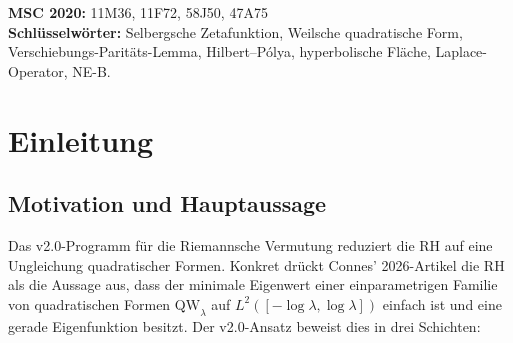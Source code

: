 \documentclass[12pt,a4paper]{article}
\theoremstyle{definition}
\theoremstyle{remark}
\newcommand{\QW}{\mathrm{QW}}
\begin{document}
\begin{abstract}
Die Abwesenheit des einschlägigen NE-B-Hindernisses im Selberg-Setting ist kein
Mangel; sie spiegelt die geometrische Koordination der Spurformel auf einem
gemeinsamen symmetrischen Raum wider, die bei den Primzahlen fehlt. Wir leiten
ein vorsichtiges Meta-Prinzip ab: der v2.0-Rahmen liefert eine gemeinsame
Quadratform-Testsprache, während ein Hilbert--Pólya-Operator zusätzliche
operatorielle Struktur verlangt. Im Selberg-Fall ist diese Struktur im
sphärischen Casimir-Kanal vorhanden; im Riemann-Fall wird sie durch den
getesteten NE-B-Weg nicht geliefert. Die Weilsche quadratische Form, nicht der
Spektraloperator, ist das gemeinsame Objekt.
\end{abstract}
\vspace{-1.0em}

\noindent\textbf{MSC 2020:} 11M36, 11F72, 58J50, 47A75\\
\textbf{Schlüsselwörter:} Selbergsche Zetafunktion, Weilsche quadratische Form, Verschiebungs-Paritäts-Lemma, Hilbert--Pólya, hyperbolische Fläche, Laplace-Operator, NE-B.

\clearpage
\tableofcontents
\clearpage

\section{Einleitung}
\label{sec:intro}

\subsection{Motivation und Hauptaussage}

Das v2.0-Programm für die Riemannsche Vermutung \cite{Geiger2026partII}
reduziert die RH auf eine Ungleichung quadratischer Formen. Konkret drückt Connes' 2026-Artikel
\cite{Connes2026} die RH als die Aussage aus, dass der minimale Eigenwert einer
einparametrigen Familie von quadratischen Formen $\QW_\lambda$ auf
$L^2([-\log\lambda,\log\lambda])$ einfach ist und eine gerade Eigenfunktion besitzt.
Der v2.0-Ansatz beweist dies in drei Schichten:
\end{document}
